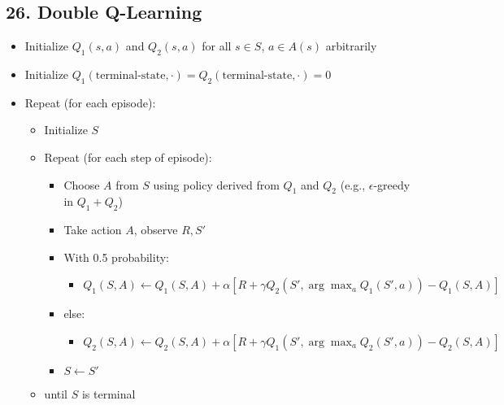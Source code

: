 \documentclass[letterpaper,10pt]{article}
\begin{document}
\begin{multicols}{2}
\section*{26. Double Q-Learning}
\begin{itemize}
    \item Initialize \( Q_1(s,a) \) and \( Q_2(s,a) \) for all \( s \in S \), \( a \in A(s) \) arbitrarily
    \item Initialize \( Q_1(\text{terminal-state}, \cdot) = Q_2(\text{terminal-state}, \cdot) = 0 \)
    \item Repeat (for each episode):
    \begin{itemize}
        \item Initialize \( S \)
        \item Repeat (for each step of episode):
        \begin{itemize}
            \item Choose \( A \) from \( S \) using policy derived from \( Q_1 \) and \( Q_2 \) (e.g., \(\epsilon\)-greedy in \( Q_1 + Q_2 \))
            \item Take action \( A \), observe \( R, S' \)
            \item With 0.5 probability:
            \begin{itemize}
                \item \( Q_1(S,A) \leftarrow Q_1(S,A) + \alpha [R + \gamma Q_2(S', \arg \max_{a} Q_1(S',a)) - Q_1(S,A)] \)
            \end{itemize}
            \item else:
            \begin{itemize}
                \item \( Q_2(S,A) \leftarrow Q_2(S,A) + \alpha [R + \gamma Q_1(S', \arg \max_{a} Q_2(S',a)) - Q_2(S,A)] \)
            \end{itemize}
            \item \( S \leftarrow S' \)
        \end{itemize}
        \item until \( S \) is terminal
    \end{itemize}
\end{itemize}




\end{multicols}
\end{document}
